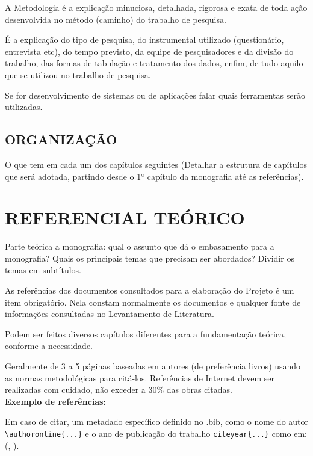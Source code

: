 \documentclass[
    12pt,				       %
    openright,			       %
    oneside,			       %
    a4paper,			       %
    chapter=TITLE,             %
    sumario=tradicional,       %
    english,			        %
    brazil, 				    %
 ]{abntex2}
\begin{document}
A Metodologia é a explicação minuciosa, detalhada, rigorosa e exata de toda ação desenvolvida no método (caminho) do trabalho de pesquisa.

É a explicação do tipo de pesquisa, do instrumental utilizado (questionário, entrevista etc), do tempo previsto, da equipe de pesquisadores e da divisão do trabalho, das formas de tabulação e tratamento dos dados, enfim, de tudo aquilo que se utilizou no trabalho de pesquisa.

Se for desenvolvimento de sistemas ou de aplicações falar quais ferramentas serão utilizadas.


\section{\MakeUppercase{Organização}}\label{sec:Organizacao}

O que tem em cada um dos capítulos seguintes (Detalhar a estrutura de capítulos que será adotada, partindo desde o 1º capítulo da monografia até as referências).

\chapter{\MakeUppercase{Referencial Teórico}}\label{sec:RefTeorico}

Parte teórica a monografia: qual o assunto que dá o embasamento para a monografia? Quais os principais temas que precisam ser abordados? Dividir os temas em subtítulos.

As referências dos documentos consultados para a elaboração do Projeto é um item obrigatório. Nela constam normalmente os documentos e qualquer fonte de informações consultadas no Levantamento de Literatura.

Podem ser feitos diversos capítulos diferentes para a fundamentação teórica, conforme a necessidade.

Geralmente de 3 a 5 páginas baseadas em autores (de preferência livros) usando as normas metodológicas para citá-los. Referências de Internet devem ser realizadas com cuidado, não exceder a 30\% das obras citadas. \\

\textbf{Exemplo de referências:}

Em caso de citar, um metadado específico definido no .bib, como o nome do autor \verb|\authoronline{...}| e o ano de publicação do trabalho \verb|citeyear{...}| como em:
(, \citeyear{NBR14724:2011}).
\end{document}
